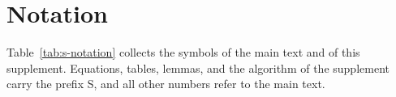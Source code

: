 
\section{Notation}
\label{sec:s-notation}
Table~\ref{tab:s-notation} collects the symbols of the main text and of this supplement. Equations, tables, lemmas, and the algorithm of the supplement carry the prefix S, and all other numbers refer to the main text.

